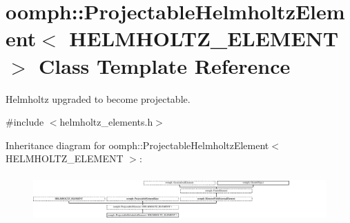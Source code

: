 \hypertarget{classoomph_1_1ProjectableHelmholtzElement}{}\section{oomph\+:\+:Projectable\+Helmholtz\+Element$<$ H\+E\+L\+M\+H\+O\+L\+T\+Z\+\_\+\+E\+L\+E\+M\+E\+NT $>$ Class Template Reference}
\label{classoomph_1_1ProjectableHelmholtzElement}


Helmholtz upgraded to become projectable.  




{\ttfamily \#include $<$helmholtz\+\_\+elements.\+h$>$}

Inheritance diagram for oomph\+:\+:Projectable\+Helmholtz\+Element$<$ H\+E\+L\+M\+H\+O\+L\+T\+Z\+\_\+\+E\+L\+E\+M\+E\+NT $>$\+:\begin{figure}[H]
\begin{center}
\leavevmode
\includegraphics[height=1.790281cm]{classoomph_1_1ProjectableHelmholtzElement}
\end{center}
\end{figure}
